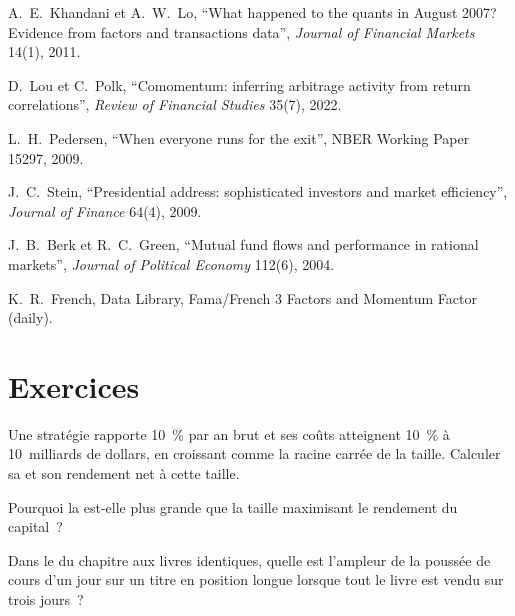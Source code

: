 \begin{omsources}
\item A.~E.~Khandani et A.~W.~Lo, ``What happened to the quants in August 2007? Evidence from factors and transactions data'', \emph{Journal of Financial Markets}
14(1), 2011.
\item D.~Lou et C.~Polk, ``Comomentum: inferring arbitrage activity from return correlations'', \emph{Review of Financial Studies} 35(7), 2022.
\item L.~H.~Pedersen, ``When everyone runs for the exit'', NBER Working Paper 15297, 2009.
\item J.~C.~Stein, ``Presidential address: sophisticated investors and market efficiency'', \emph{Journal of Finance} 64(4), 2009.
\item J.~B.~Berk et R.~C.~Green, ``Mutual fund flows and performance in rational markets'', \emph{Journal of Political Economy} 112(6), 2004.
\item K.~R.~French, Data Library, Fama/French 3 Factors and Momentum Factor (daily).
\end{omsources}

\section{Exercices}

\begin{exercise}[$\star$]\label{exo:rs:capacity-decay-and-crowding:1}
Une stratégie rapporte 10~\% par an brut et ses coûts atteignent 10~\% à 10~milliards de dollars, en croissant comme la racine carrée de la taille. Calculer sa  et son rendement net
à cette taille.
\end{exercise}

\begin{exercise}[$\star$]\label{exo:rs:capacity-decay-and-crowding:2}
Pourquoi la  est-elle plus grande que la taille maximisant le rendement du capital~?
\end{exercise}

\begin{exercise}[$\star$]\label{exo:rs:capacity-decay-and-crowding:3}
Dans le  du chapitre aux livres identiques, quelle est l'ampleur de la poussée de cours d'un jour sur un titre en position longue lorsque tout le livre est vendu sur trois jours~?
\end{exercise}

